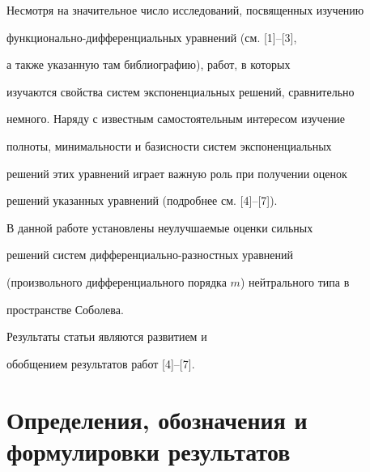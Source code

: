 \date{}




\pagestyle{plain} %







\maketitle


\label{begin}








Несмотря на значительное число исследований, посвященных изучению


функционально-дифференциальных уравнений (см. [1]--[3],


а также указанную там библиографию), работ, в которых


изучаются свойства систем экспоненциальных решений, сравнительно


немного. Наряду с известным самостоятельным интересом изучение


полноты, минимальности и базисности систем экспоненциальных


решений этих уравнений играет важную роль при получении оценок


решений указанных уравнений (подробнее см. [4]--[7]).





В данной работе установлены неулучшаемые оценки сильных


решений систем диф\-фе\-рен\-ци\-аль\-но-раз\-ност\-ных уравнений


(произвольного дифференциального порядка $m$) нейтрального типа в


пространстве Соболева.





Результаты статьи являются развитием и


обобщением результатов работ [4]--[7].








\section{Определения, обозначения и формулировки результатов}





